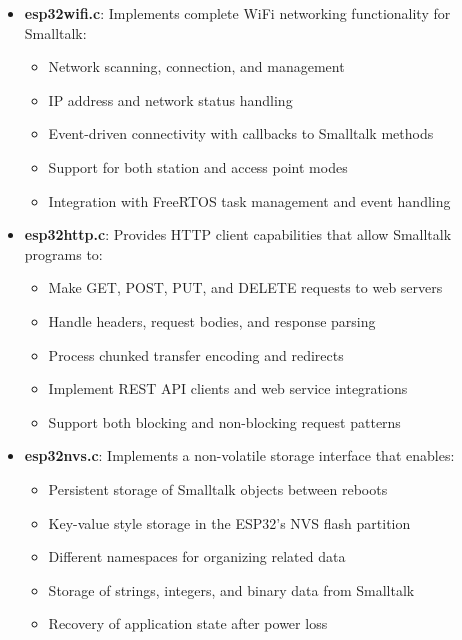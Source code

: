 \documentclass[12pt,a4paper]{report}
\begin{document}
\begin{itemize}
    \item \textbf{esp32wifi.c}: Implements complete WiFi networking functionality for Smalltalk:
    \begin{itemize}
        \item Network scanning, connection, and management
        \item IP address and network status handling
        \item Event-driven connectivity with callbacks to Smalltalk methods
        \item Support for both station and access point modes
        \item Integration with FreeRTOS task management and event handling
    \end{itemize}
    
    \item \textbf{esp32http.c}: Provides HTTP client capabilities that allow Smalltalk programs to:
    \begin{itemize}
        \item Make GET, POST, PUT, and DELETE requests to web servers
        \item Handle headers, request bodies, and response parsing
        \item Process chunked transfer encoding and redirects
        \item Implement REST API clients and web service integrations
        \item Support both blocking and non-blocking request patterns
    \end{itemize}

    \item \textbf{esp32nvs.c}: Implements a non-volatile storage interface that enables:
    \begin{itemize}
        \item Persistent storage of Smalltalk objects between reboots
        \item Key-value style storage in the ESP32's NVS flash partition
        \item Different namespaces for organizing related data
        \item Storage of strings, integers, and binary data from Smalltalk
        \item Recovery of application state after power loss
    \end{itemize}


\end{itemize}
\end{document}
